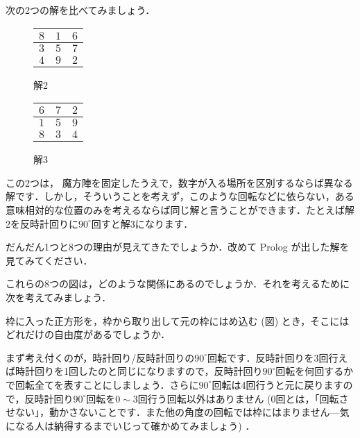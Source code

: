 \documentclass[11pt]{jsarticle}
\begin{document}
次の2つの解を比べてみましょう．
\begin{figure}[H]
  \captionsetup{labelformat=empty}
  \begin{minipage}{0.49\hsize}
    \centering
    \begin{tabular}{|c|c|c|}
      \hline
      $8$ & $1$ & $6$ \\ \hline
      $3$ & $5$ & $7$ \\ \hline
      $4$ & $9$ & $2$ \\ \hline
    \end{tabular}
    \caption{解2}
    \label{}
  \end{minipage}
  \begin{minipage}{0.49\hsize}
    \centering
    \begin{tabular}{|c|c|c|}
      \hline
      $6$ & $7$ & $2$ \\ \hline
      $1$ & $5$ & $9$ \\ \hline
      $8$ & $3$ & $4$ \\ \hline
    \end{tabular}
    \caption{解3}
    \label{}
  \end{minipage}
\end{figure}

この2つは，
魔方陣を固定したうえで，数字が入る場所を区別するならば異なる解です．しかし，そういうことを考えず，このような回転などに依らない，ある意味相対的な位置のみを考えるならば同じ解と言うことができます．たとえば解2を反時計回りに$90^\circ$回すと解3になります．

だんだん1つと8つの理由が見えてきたでしょうか．改めて Prolog が出した解を見てみてください．

これらの8つの図は，どのような関係にあるのでしょうか．それを考えるために次を考えてみましょう．

枠に入った正方形を，枠から取り出して元の枠にはめ込む (図) とき，そこにはどれだけの自由度があるでしょうか．

まず考え付くのが，時計回り/反時計回りの$90^\circ$回転です．反時計回りを3回行えば時計回りを1回したのと同じになりますので，反時計回り$90^\circ$回転を何回するかで回転全てを表すことにしましょう．さらに$90^\circ$回転は4回行うと元に戻りますので，反時計回り$90^\circ$回転を$0\sim 3$回行う回転以外はありません (0回とは，「回転させない」，動かさないことです．また他の角度の回転では枠にはまりません---気になる人は納得するまでいじって確かめてみましょう) ．
\end{document}
